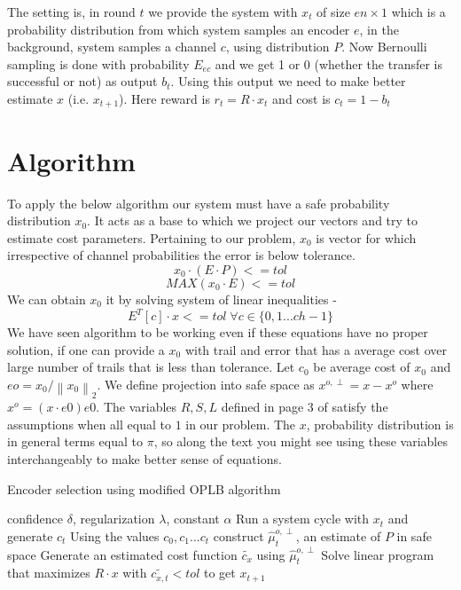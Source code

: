 \documentclass[BTech,thesis]{iitmdiss}
\newcommand{\norm}[1]{\left\lVert#1\right\rVert}
\begin{document}
The setting is, in round $t$ we provide the system with $x_t$ of size $en\times1$ which is a probability distribution from which system samples an encoder $e$, in the background, system samples a channel $c$, using distribution $P$. Now Bernoulli sampling is done with probability $E_{ec}$ and we get 1 or 0 (whether the transfer is successful or not) as output $b_t$. Using this output we need to make better estimate $x$ (i.e. $x_{t+1}$). Here reward is $r_t = R\cdot x_t$ and cost is $c_t = 1 - b_t$ 

\section{Algorithm}
To apply the below algorithm our system must have a safe probability distribution $x_0$. It acts as a base to which we project our vectors and try to estimate cost parameters. Pertaining to our problem, $x_0$ is vector for which irrespective of channel probabilities the error is below tolerance. 
$$ x_0\cdot(E\cdot P) <= tol $$
$$ MAX(x_0\cdot E) <= tol $$
We can obtain $x_0$ it by solving system of linear inequalities - 
$$ E^{T}[c]\cdot x <= tol \; \forall c \in \{0,1...ch-1\}$$
We have seen algorithm to be working even if these equations have no proper solution, if one can provide a $x_0$ with trail and error that has a average cost over large number of trails that is less than tolerance. Let $c_0$ be average cost of $x_0$ and $eo = x_0/\norm{x_0}_2$. We define projection into safe space as $x^{o,\perp} = x - x^o$ where $x^o = (x\cdot e0)e0$. The variables $R,S,L$ defined in page 3 of \cite{pan:pr:sblc} satisfy the assumptions when all equal to $1$ in our problem. The $x$, probability distribution is in general terms equal to $\pi$, so along the text you might see using these variables interchangeably to make better sense of equations. 

\begin{algorithm}
\caption{Encoder selection using modified OPLB algorithm}
\begin{algorithmic}
    \REQUIRE confidence $\delta$, regularization $\lambda$, constant $\alpha$
        \STATE Run a system cycle with $x_t$ and generate $c_t$
        \STATE Using the values $c_0, c_1 ... c_t$ construct $\widehat{\mu}^{o,\perp}_t$, an estimate of $P$ in safe space
        \STATE Generate an estimated cost function $\widetilde{c_x}$ using $\widehat{\mu}^{o,\perp}_t$
        \STATE Solve linear program that maximizes $R\cdot x$ with $\widetilde{c_{x,t}} < tol$ to get $x_{t+1}$
    \ENDFOR
\end{algorithmic}
\end{algorithm}
\end{document}
